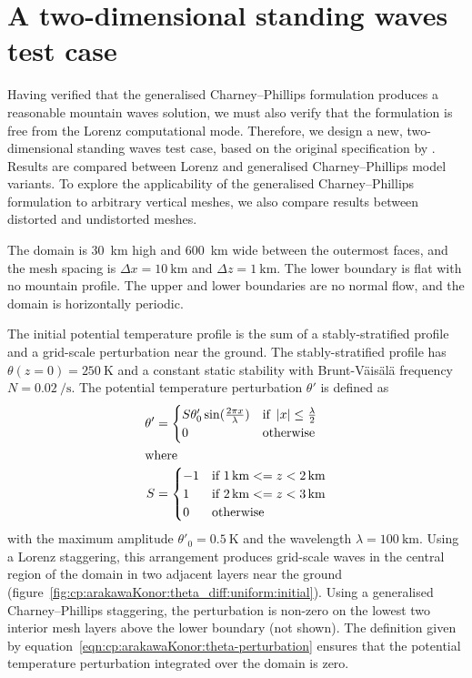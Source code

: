 \section{A two-dimensional standing waves test case}
\label{sec:cp:arakawaKonor}

Having verified that the generalised Charney--Phillips formulation produces a reasonable mountain waves solution, we must also verify that the formulation is free from the Lorenz computational mode.
Therefore, we design a new, two-dimensional standing waves test case, based on the original specification by \citet{arakawa-konor1996}.
Results are compared between Lorenz and generalised Charney--Phillips model variants.
To explore the applicability of the generalised Charney--Phillips formulation to arbitrary vertical meshes, we also compare results between distorted and undistorted meshes.

The domain is \SI{30}{\kilo\meter} high and \SI{600}{\kilo\meter} wide between the outermost faces, and the mesh spacing is $\Delta x = \SI{10}{\kilo\meter}$ and $\Delta z = \SI{1}{\kilo\meter}$.  The lower boundary is flat with no mountain profile.
The upper and lower boundaries are no normal flow, and the domain is horizontally periodic.

The initial potential temperature profile is the sum of a stably-stratified profile and a grid-scale perturbation near the ground.
The stably-stratified profile has $\theta(z = 0) = \SI{250}{\kelvin}$ and a constant static stability with Brunt-V\"ais\"al\"a frequency $N = \SI{0.02}{\per\second}$.
The potential temperature perturbation $\theta'$ is defined as
\begin{subequations}
\label{eqn:cp:arakawaKonor:theta-perturbation}
\begin{align}
	\theta' &= \begin{cases} S \theta'_0 \sin(\frac{2 \pi x}{\lambda}) & \text{if } \left\lvert x \right\rvert \leq \frac{\lambda}{2} \\
		0 & \text{otherwise} \\
	\end{cases} \\
\shortintertext{where}
	S &= \begin{cases}
		-1 & \text{if } \SI{1}{\kilo\meter} <= z < \SI{2}{\kilo\meter} \\
		1 & \text{if } \SI{2}{\kilo\meter} <= z < \SI{3}{\kilo\meter} \\
		0 & \text{otherwise} \\
	\end{cases}
\end{align}
\end{subequations}
with the maximum amplitude $\theta'_0 = \SI{0.5}{\kelvin}$ and the wavelength $\lambda = \SI{100}{\kilo\meter}$.
Using a Lorenz staggering, this arrangement produces grid-scale waves in the central region of the domain in two adjacent layers near the ground (figure~\ref{fig:cp:arakawaKonor:theta_diff:uniform:initial}).
Using a generalised Charney--Phillips staggering, the perturbation is non-zero on the lowest two interior mesh layers above the lower boundary (not shown).
The definition given by equation~\eqref{eqn:cp:arakawaKonor:theta-perturbation} ensures that the potential temperature perturbation integrated over the domain is zero.

